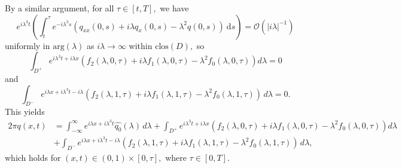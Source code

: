 By a similar argument, for all $\tau \in [t,T],$ we have  
\[ e^{i \lambda^3 t} \left(\int_{t}^{\tau} e^{- i \lambda^3 s}\left(q_{xx}(0, s) + i \lambda q_x(0, s) - \lambda^2 q(0, s)\right) ~ \mathrm{d}s \right) = \mathcal{O}(|i\lambda|^{-1})\]
uniformly in $\mathrm{arg}(\lambda)$ as $i\lambda \to \infty$ within $\mathrm{clos}(D),$ so
\[ \int_{D^+} e^{i \lambda^3 t+i\lambda x}\left(f_2(\lambda, 0, \tau) + i \lambda f_1(\lambda, 0, \tau) - \lambda^2 f_0(\lambda, 0, \tau)\right)d\lambda = 0\]
and 
\[ \int_{D^-} e^{i\lambda x+i \lambda^3 t-i\lambda} \left(f_2(\lambda, 1, \tau) + i \lambda f_1(\lambda, 1, \tau) - \lambda^2 f_0(\lambda, 1, \tau)\right)\,d\lambda = 0.\]
This yields
\begin{equation*}
\begin{aligned}
2\pi q(x, t) &= \int_{-\infty}^\infty e^{i\lambda x + i \lambda^3 t}\hat{q_0}(\lambda)\,d\lambda + \int_{D^+} e^{i \lambda^3 t+i\lambda x}\left(f_2(\lambda, 0, \tau) + i \lambda f_1(\lambda, 0, \tau) - \lambda^2 f_0(\lambda, 0, \tau)\right)d\lambda \\
&+\int_{D^-} e^{i\lambda x+i \lambda^3 t-i\lambda} \left(f_2(\lambda, 1, \tau) + i \lambda f_1(\lambda, 1, \tau) - \lambda^2 f_0(\lambda, 1, \tau)\right)\,d\lambda,
\end{aligned}
\end{equation*}
which holds for $(x,t) \in (0,1)\times[0,\tau],$ where $\tau \in [0,T].$
